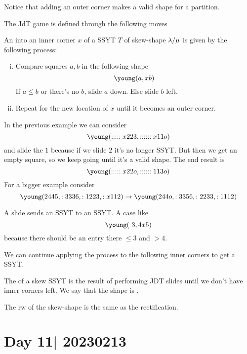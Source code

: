 \documentclass[12pt]{memoir}
\begin{document}
\begin{Rmk}
    Notice that adding an outer corner makes a valid shape for a partition.
\end{Rmk}

The JdT game is defined through the following moves
\begin{Def}
    An  into an inner corner $x$ of a SSYT $T$ of skew-shape $\lambda/\mu$ is given by the following process:
    \begin{enumerate}[i)]
        \itemsep=-0.4em
        \item Compare squares $a,b$ in the following shape 
        $$\young(a,xb)$$
        If $a\leq b$ or there's no $b$, slide $a$ down. Else slide $b$ left.
        \item Repeat for the new location of $x$ until it becomes an outer corner.
    \end{enumerate}
\end{Def}

\begin{Ex}
    In the previous example we can consider 
    $$\young(:::::x223,::::::x11o)$$ and slide the $1$ because if we slide $2$ it's no longer SSYT. But then we get an empty square, so we keep going until it's a valid shape. The end result is 
    $$\young(:::::x22o,::::::113o)$$
    For a bigger example consider 
    $$\young(2445,:3336,:1223,:x112)\to\young(244o,:3356,:2233,:1112)$$
\end{Ex}

\begin{Rmk}
    A slide sends an SSYT to an SSYT. A case like 
    $$\young(~3,4x5)$$
    because there should be an entry there $\leq 3$ and $>4$. 
\end{Rmk}

We can continue applying the process to the following inner corners to get a SSYT. 

\begin{Def}
    The  of a skew SSYT is the result of performing JDT slides until we don't have inner corners left. We say that the shape is .
\end{Def}

\begin{Rmk}
    The rw of the skew-shape is the same as the rectification.
\end{Rmk}

\section{Day 11| 20230213}
\end{document}
